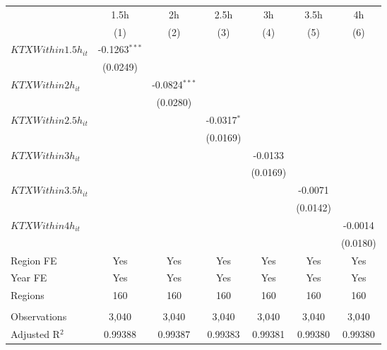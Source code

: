 \begingroup
\centering
\begin{tabular}{lcccccc}
   \toprule
                        & 1.5h            & 2h              & 2.5h          & 3h       & 3.5h     & 4h \\   
                        & (1)             & (2)             & (3)           & (4)      & (5)      & (6)\\  
   \midrule 
   $KTXWithin1.5h_{it}$ & -0.1263$^{***}$ &                 &               &          &          &   \\   
                        & (0.0249)        &                 &               &          &          &   \\   
   $KTXWithin2h_{it}$   &                 & -0.0824$^{***}$ &               &          &          &   \\   
                        &                 & (0.0280)        &               &          &          &   \\   
   $KTXWithin2.5h_{it}$ &                 &                 & -0.0317$^{*}$ &          &          &   \\   
                        &                 &                 & (0.0169)      &          &          &   \\   
   $KTXWithin3h_{it}$   &                 &                 &               & -0.0133  &          &   \\   
                        &                 &                 &               & (0.0169) &          &   \\   
   $KTXWithin3.5h_{it}$ &                 &                 &               &          & -0.0071  &   \\   
                        &                 &                 &               &          & (0.0142) &   \\   
   $KTXWithin4h_{it}$   &                 &                 &               &          &          & -0.0014\\   
                        &                 &                 &               &          &          & (0.0180)\\   
   Region FE            & Yes             & Yes             & Yes           & Yes      & Yes      & Yes\\  
   Year FE              & Yes             & Yes             & Yes           & Yes      & Yes      & Yes\\  
   Regions              & 160             & 160             & 160           & 160      & 160      & 160\\  
    \\
   Observations         & 3,040           & 3,040           & 3,040         & 3,040    & 3,040    & 3,040\\  
   Adjusted R$^2$       & 0.99388         & 0.99387         & 0.99383       & 0.99381  & 0.99380  & 0.99380\\  
   \bottomrule
\end{tabular}
\par\endgroup
